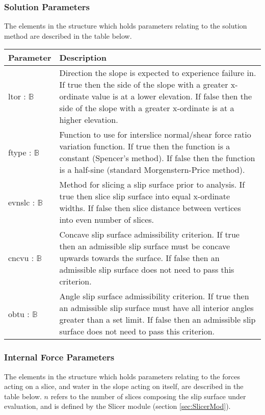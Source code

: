 \documentclass[12pt, titlepage]{article}
\begin{document}
\subsubsection{Solution Parameters} \label{Tbl:SolnParam}
\noindent
The elements in the structure which holds parameters relating to the 
solution method are described in the table below.

\begin{center}
\begin{longtable}{ p{} 
    p{}}\hline 

  \textbf{Parameter} & \textbf{Description}\\ \hline

  ltor : $\mathbb{B}$ & Direction the slope is expected to
  experience failure in. If true then the side of the slope with a
  greater x-ordinate value is at a lower elevation. If false then the
  side of the slope with a greater x-ordinate is at a higher
  elevation.\\

  ftype : $\mathbb{B}$ & Function to use for interslice normal/shear force 
  ratio variation function. If true then the function is a constant (Spencer's 
  method). If false then the function is a half-sine (standard 
  Morgenstern-Price method). \\

  evnslc : $\mathbb{B}$ & Method for slicing a slip surface prior to analysis. 
  If true then slice slip surface into equal x-ordinate widths. If false then 
  slice distance between vertices into even number of slices. \\

  cncvu : $\mathbb{B}$ & Concave slip surface admissibility
  criterion. If true then an admissible slip surface must be concave
  upwards towards the surface. If false then an admissible slip
  surface does not need to pass this criterion.\\

  obtu : $\mathbb{B}$ & Angle slip surface
  admissibility criterion. If true then an admissible slip surface
  must have all interior angles greater than a set limit. If false
  then an admissible slip surface does not need to pass this
  criterion.\\ \hline
\end{longtable}
\end{center}

\subsubsection{Internal Force Parameters} \label{Tbl:ForceParam}
\noindent
The elements in the structure which holds parameters 
relating to the forces acting on a slice, and water in the slope acting
on itself, are described in the table below. $n$ refers to the number of slices 
composing the slip surface under evaluation, and is defined by the Slicer 
module (section \ref{sec:SlicerMod}).
\end{document}
